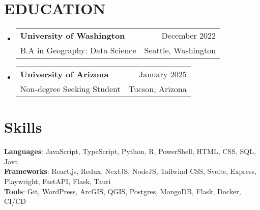 \documentclass[letterpaper,11pt]{article}
\makeatletter
\newcommand{\resumeSubheading}[4]{
  \vspace{-2pt}\item
    \begin{tabular*}{0.97\textwidth}[t]{l@{\extracolsep{\fill}}r}
      \textbf{#1} & #2 \\
      {\small#3} & {\small #4} \\
    \end{tabular*}\vspace{-7pt}
}
\newcommand{\resumeSubHeadingListStart}{\begin{itemize}[leftmargin=0.15in, label={}]}
\newcommand{\resumeSubHeadingListEnd}{\end{itemize}}
\makeatother
\begin{document}
\section{EDUCATION}
  \resumeSubHeadingListStart
    \resumeSubheading
      {University of Washington}{December 2022}
      {B.A in Geography: Data Science}{Seattle, Washington}
    \resumeSubheading
      {University of Arizona}{January 2025}
      {Non-degree Seeking Student}{Tucson, Arizona}
  \resumeSubHeadingListEnd

\section{Skills}
 \begin{itemize}[leftmargin=0.15in, label={}]
    \small{\item{
     \textbf{Languages}{: JavaScript, TypeScript, Python, R, PowerShell, HTML, CSS, SQL, Java} \\
     \vspace{3pt}
     \textbf{Frameworks}{: React.js, Redux, NextJS, NodeJS, Tailwind CSS, Svelte, Express, Playwright, FastAPI, Flask, Tauri} \\
     \vspace{3pt}
     \textbf{Tools}{: Git, WordPress, ArcGIS, QGIS, Postgres, MongoDB, Flask, Docker, CI/CD }}}
 \end{itemize}
\end{document}
